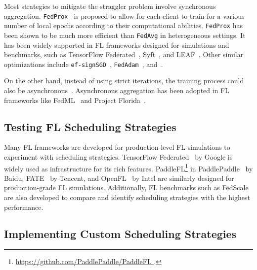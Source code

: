 \documentclass[conference]{IEEEtran}
\begin{document}
Most strategies to mitigate the straggler problem involve
synchronous aggregation.
\verb|FedProx|~\cite{li2020federated} is proposed to
allow for each client to train for a various number of local epochs according to
their computational abilities.
\verb|FedProx| has been shown to be much more efficient than
\verb|FedAvg| in heterogeneous settings.
It has been widely supported in FL frameworks designed for simulations and
benchmarks, such as
TensorFlow Federated~\cite{tff},
Syft~\cite{ryffel2018generic,Ziller2021,hall2021syft}, and
LEAF~\cite{caldas2018leaf}.
Other similar optimizations include
\verb|ef-signSGD|~\cite{karimireddy2019error},
\verb|FedAdam|~\cite{reddi2020adaptive},
and~\cite{luo2021cost}.

\newcommand{\FedML}{FedML~\cite{he2020fedml}}
\newcommand{\Florida}{Project Florida~\cite{madrigal2023project}}

On the other hand,
instead of using strict iterations,
the training process could also be
asynchronous~\cite{chilimbi2014project,zhu2022online,huba2022papaya}.
Asynchronous aggregation has been adopted in
FL frameworks like \FedML{} and \Florida{}.

\subsection{Testing FL Scheduling Strategies}

Many FL frameworks are developed for production-level FL simulations to
experiment with scheduling strategies.
TensorFlow Federated~\cite{tff} by Google is widely used as infrastructure for
its rich features.
PaddleFL\footnote{\url{
    https://github.com/PaddlePaddle/PaddleFL
}.} in PaddlePaddle~\cite{ma2019paddlepaddle} by Baidu,
FATE~\cite{liu2021fate} by Tencent, and
OpenFL~\cite{patrick2022openfl} by Intel
are similarly designed for
production-grade FL simulations.
Additionally,
FL benchmarks such as FedScale~\cite{lai2022fedscale} are also developed to
compare and identify scheduling strategies with the highest performance.

\subsection{Implementing Custom Scheduling Strategies}

\newcommand{\Flower}{Flower~\cite{beutel2020flower}}
\end{document}
